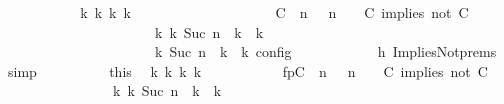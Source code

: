 \begin{isabellebody}
\ \ \ \ \ \ \ \ \isamarkupfalse%
\ \isamarkupfalse%
\ {\isacartoucheopen}{\isasymexists}{\isasymGamma}\isactrlsub k\ {\isasymPsi}\isactrlsub k\ {\isasymPhi}\isactrlsub k\ k{\isachardot}\isanewline
\ \ \ \ \ \ \ \ \ \ \ \ \ \ \ \ \ \ \ \ {\isacharparenleft}{\isacharparenleft}{\isacharparenleft}{\isacharparenleft}C\ {\isasymnot}{\isasymUp}\ n{\isacharparenright}\ {\isacharhash}\ {\isasymGamma}{\isacharparenright}{\isacharcomma}\ n\ {\isasymturnstile}\ {\isasymPsi}\ {\isasymtriangleright}\ {\isacharparenleft}{\isacharparenleft}C\ implies\ not\ C\ {\isacharhash}\ {\isasymPhi}{\isacharparenright}{\isacharparenright}\isanewline
\ \ \ \ \ \ \ \ \ \ \ \ \ \ \ \ \ \ \ \ \ \ {\isasymhookrightarrow}\isactrlbsup k\isactrlesup \ {\isacharparenleft}{\isasymGamma}\isactrlsub k{\isacharcomma}\ Suc\ n\ {\isasymturnstile}\ {\isasymPsi}\isactrlsub k\ {\isasymtriangleright}\ {\isasymPhi}\isactrlsub k{\isacharparenright}{\isacharparenright}\isanewline
\ \ \ \ \ \ \ \ \ \ \ \ \ \ \ \ \ \ {\isasymand}\ {\isasymrho}\ {\isasymin}\ {\isasymlbrakk}\ {\isasymGamma}\isactrlsub k{\isacharcomma}\ Suc\ n\ {\isasymturnstile}\ {\isasymPsi}\isactrlsub k\ {\isasymtriangleright}\ {\isasymPhi}\isactrlsub k\ {\isasymrbrakk}\isactrlsub c\isactrlsub o\isactrlsub n\isactrlsub f\isactrlsub i\isactrlsub g{\isacartoucheclose}\isanewline
\ \ \ \ \ \ \ \ \ \ \isamarkupfalse%
\ h{}\ ImpliesNot{\isachardot}prems\ \isamarkupfalse%
\ simp\isanewline
\ \ \ \ \ \ \ \ \isamarkupfalse%
\ this\ \isamarkupfalse%
\ {\isasymGamma}\isactrlsub k\ {\isasymPsi}\isactrlsub k\ {\isasymPhi}\isactrlsub k\ k\ \isanewline
\ \ \ \ \ \ \ \ \ \ fp{\isacharcolon}{\isacartoucheopen}{\isacharparenleft}{\isacharparenleft}{\isacharparenleft}{\isacharparenleft}C\ {\isasymnot}{\isasymUp}\ n{\isacharparenright}\ {\isacharhash}\ {\isasymGamma}{\isacharparenright}{\isacharcomma}\ n\ {\isasymturnstile}\ {\isasymPsi}\ {\isasymtriangleright}\ {\isacharparenleft}{\isacharparenleft}C\ implies\ not\ C\ {\isacharhash}\ {\isasymPhi}{\isacharparenright}{\isacharparenright}\isanewline
\ \ \ \ \ \ \ \ \ \ \ \ \ \ \ \ {\isasymhookrightarrow}\isactrlbsup k\isactrlesup \ {\isacharparenleft}{\isasymGamma}\isactrlsub k{\isacharcomma}\ Suc\ n\ {\isasymturnstile}\ {\isasymPsi}\isactrlsub k\ {\isasymtriangleright}\ {\isasymPhi}\isactrlsub k{\isacharparenright}{\isacharparenright}{\isacartoucheclose}\isanewline

\end{isabellebody}
